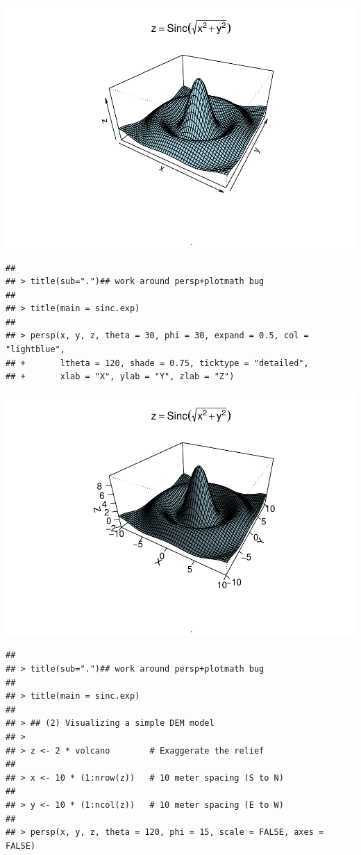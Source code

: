 \documentclass[
]{book}
\begin{document}
\includegraphics{TudodoR_files/figure-latex/unnamed-chunk-146-1.pdf}

\begin{verbatim}
## 
## > title(sub=".")## work around persp+plotmath bug
## 
## > title(main = sinc.exp)
## 
## > persp(x, y, z, theta = 30, phi = 30, expand = 0.5, col = "lightblue",
## +       ltheta = 120, shade = 0.75, ticktype = "detailed",
## +       xlab = "X", ylab = "Y", zlab = "Z")
\end{verbatim}

\includegraphics{TudodoR_files/figure-latex/unnamed-chunk-146-2.pdf}

\begin{verbatim}
## 
## > title(sub=".")## work around persp+plotmath bug
## 
## > title(main = sinc.exp)
## 
## > ## (2) Visualizing a simple DEM model
## > 
## > z <- 2 * volcano        # Exaggerate the relief
## 
## > x <- 10 * (1:nrow(z))   # 10 meter spacing (S to N)
## 
## > y <- 10 * (1:ncol(z))   # 10 meter spacing (E to W)
## 
## > persp(x, y, z, theta = 120, phi = 15, scale = FALSE, axes = FALSE)
\end{verbatim}
\end{document}
